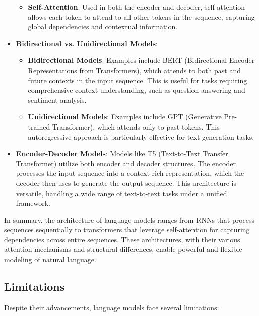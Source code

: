 \begin{itemize}
\begin{itemize}
        \item \textbf{Self-Attention}: Used in both the encoder and decoder, self-attention allows each token to attend to all other tokens in the sequence, capturing global dependencies and contextual information.
    \end{itemize}

    \item \textbf{Bidirectional vs. Unidirectional Models}:
    \begin{itemize}
        \item \textbf{Bidirectional Models}: Examples include BERT (Bidirectional Encoder Representations from Transformers), which attends to both past and future contexts in the input sequence. This is useful for tasks requiring comprehensive context understanding, such as question answering and sentiment analysis.
        
        \item \textbf{Unidirectional Models}: Examples include GPT (Generative Pre-trained Transformer), which attends only to past tokens. This autoregressive approach is particularly effective for text generation tasks.
    \end{itemize}
    
    \item \textbf{Encoder-Decoder Models}: Models like T5 (Text-to-Text Transfer Transformer) utilize both encoder and decoder structures. The encoder processes the input sequence into a context-rich representation, which the decoder then uses to generate the output sequence. This architecture is versatile, handling a wide range of text-to-text tasks under a unified framework.
\end{itemize}

In summary, the architecture of language models ranges from RNNs that process sequences sequentially to transformers that leverage self-attention for capturing dependencies across entire sequences. These architectures, with their various attention mechanisms and structural differences, enable powerful and flexible modeling of natural language.


\subsection{Limitations}

Despite their advancements, language models face several limitations:

